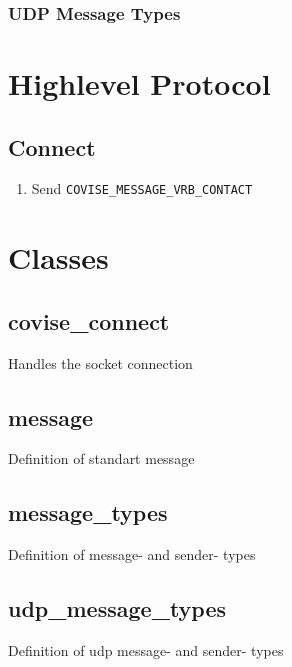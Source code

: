 \subsubsection{UDP Message Types}

\begin{messagetypes}
\end{messagetypes}

\section{Highlevel Protocol}

\subsection{Connect}

\begin{enumerate}
	\item Send \lstinline|COVISE_MESSAGE_VRB_CONTACT|	
\end{enumerate}


\section{Classes}

\subsection{covise\_connect}

Handles the socket connection 

\subsection{message}

Definition of standart message

\subsection{message\_types}

Definition of message- and sender- types 

\subsection{udp\_message\_types}
Definition of udp message- and sender- types 

